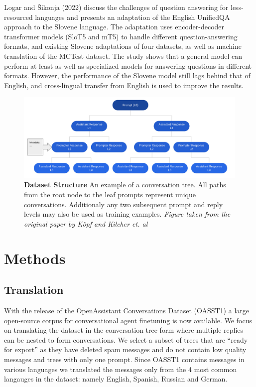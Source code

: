 \documentclass[fleqn,moreauthors,10pt]{ds_report}
\begin{document}
Logar and Šikonja (2022) \cite{logar2022unified} discuss the challenges of question answering for less-resourced languages and presents an adaptation of the English UnifiedQA approach to the Slovene language. The adaptation uses encoder-decoder transformer models (SloT5 and mT5) to handle different question-answering formats, and existing Slovene adaptations of four datasets, as well as machine translation of the MCTest dataset. The study shows that a general model can perform at least as well as specialized models for answering questions in different formats. However, the performance of the Slovene model still lags behind that of English, and cross-lingual transfer from English is used to improve the results.


\begin{figure}[ht]\centering
	\includegraphics[width=\linewidth]{fig/dataset.png}
	\caption{\textbf{Dataset Structure} An example of a conversation tree. All paths from the root node to the leaf prompts represent unique conversations. Additionaly any two subsequent prompt and reply levels may also be used as training examples. \textit{Figure taken from the original paper by Köpf and Kilcher et. al \cite{köpf2023openassistant}}}
	\label{fig:dataset}
\end{figure}


\section*{Methods}

    \subsection*{Translation}
    
    With the release of the OpenAssistant Conversations Dataset (OASST1) a large open-source corpus for conversational agent finetuning is now available.
    We focus on translating the dataset in the conversation tree form where multiple replies can be nested to form conversations.
    We select a subset of trees that are ``ready for export'' as they have deleted spam messages and do not contain low quality messages and trees with only one prompt.
    Since OASST1 contains messages in various languages we translated the messages only from the 4 most common langauges in the dataset: namely English, Spanish, Russian and German.
    
\end{document}
